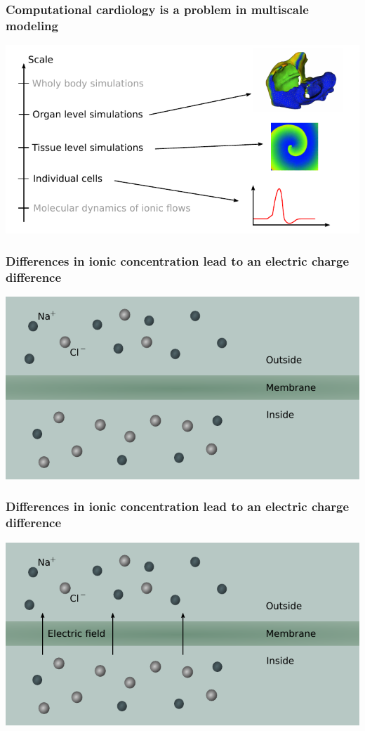 \documentclass[norsk, 12pt]{beamer}
\begin{document}
\begin{frame}[fragile]
\frametitle{Computational cardiology is a problem in multiscale modeling}
\begin{center}
\includegraphics[width=\textwidth]{multiscale1.pdf}
\end{center}
\end{frame}


\begin{frame}[fragile]
\frametitle{Differences in ionic concentration lead to an electric charge difference}
\begin{center}
\includegraphics[width=\textwidth]{membrane0.pdf}
\end{center}
\end{frame}

\begin{frame}[fragile]
\frametitle{Differences in ionic concentration lead to an electric charge difference}
\begin{center}
\includegraphics[width=\textwidth]{membrane1.pdf}
\end{center}
\end{frame}
\end{document}
